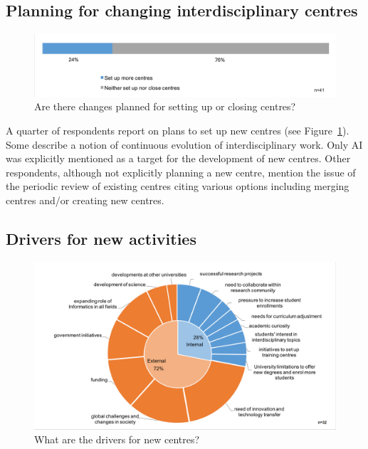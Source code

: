 \subsection{Planning for changing interdisciplinary centres}

\begin{figure}[h]
\centering
\includegraphics[width = \linewidth]{charts/5f.png}
\caption{Are there changes planned for setting up or closing centres?}
\label{sect5:changes}
\end{figure}

A quarter of respondents report on plans to set up new centres (see Figure~\ref{sect5:changes}). Some describe a notion of continuous evolution of interdisciplinary work. Only AI was explicitly mentioned as a target for the development of new centres. Other respondents, although not explicitly planning a new centre, mention the issue of the periodic review of existing centres citing various options including merging centres and/or creating new centres.  

\subsection{Drivers for new activities}

\begin{figure}[h]
\centering
\includegraphics[width = \linewidth]{charts/5g.png}
\caption{What are the drivers for new centres?}
\label{sect5:drivers}
\end{figure}
                                                                                                                    

